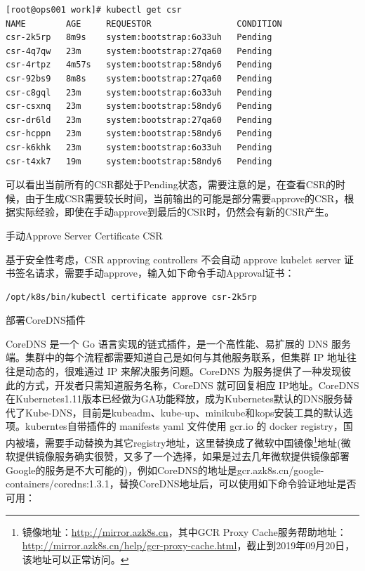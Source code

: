 \documentclass[8pt]{book}
\makeatletter
\numberwithin{dummy}{section}
\theoremstyle{ocrenumbox}
\theoremstyle{blacknumex}
\theoremstyle{blacknumbox}
\theoremstyle{ocrenum}
\renewcommand{\subsection}{\@startsection {subsection}{2}{\z@}
	{-3ex \@plus -0.1ex \@minus -.4ex}
	{0.5ex \@plus.2ex }
	{\normalfont\sffamily\bfseries}}
\renewcommand{\subsubsection}{\@startsection {subsubsection}{3}{\z@}
	{-2ex \@plus -0.1ex \@minus -.2ex}
	{.2ex \@plus.2ex }
	{\normalfont\small\sffamily\bfseries}}
\makeatother
\begin{document}
\begin{lstlisting}[language=Bash]
[root@ops001 work]# kubectl get csr
NAME        AGE     REQUESTOR                 CONDITION
csr-2k5rp   8m9s    system:bootstrap:6o33uh   Pending
csr-4q7qw   23m     system:bootstrap:27qa60   Pending
csr-4rtpz   4m57s   system:bootstrap:58ndy6   Pending
csr-92bs9   8m8s    system:bootstrap:27qa60   Pending
csr-c8gql   23m     system:bootstrap:6o33uh   Pending
csr-csxnq   23m     system:bootstrap:58ndy6   Pending
csr-dr6ld   23m     system:bootstrap:27qa60   Pending
csr-hcppn   23m     system:bootstrap:58ndy6   Pending
csr-k6khk   23m     system:bootstrap:6o33uh   Pending
csr-t4xk7   19m     system:bootstrap:58ndy6   Pending
\end{lstlisting}

可以看出当前所有的CSR都处于Pending状态，需要注意的是，在查看CSR的时候，由于生成CSR需要较长时间，当前输出的可能是部分需要approve的CSR，根据实际经验，即使在手动approve到最后的CSR时，仍然会有新的CSR产生。

\subsubsection{手动Approve Server Certificate CSR}

基于安全性考虑，CSR approving controllers 不会自动 approve kubelet server 证书签名请求，需要手动approve，输入如下命令手动Approval证书：

\begin{lstlisting}[language=Bash]
/opt/k8s/bin/kubectl certificate approve csr-2k5rp
\end{lstlisting}

\subsection{部署CoreDNS插件}

CoreDNS 是一个 Go 语言实现的链式插件，是一个高性能、易扩展的 DNS 服务端。集群中的每个流程都需要知道自己是如何与其他服务联系，但集群 IP 地址往往是动态的，很难通过 IP 来解决服务问题。CoreDNS 为服务提供了一种发现彼此的方式，开发者只需知道服务名称，CoreDNS 就可回复相应 IP地址。CoreDNS在Kubernetes1.11版本已经做为GA功能释放，成为Kubernetes默认的DNS服务替代了Kube-DNS，目前是kubeadm、kube-up、minikube和kops安装工具的默认选项。kuberntes自带插件的 manifests yaml 文件使用 gcr.io 的 docker registry，国内被墙，需要手动替换为其它registry地址，这里替换成了微软中国镜像\footnote{镜像地址：\url{http://mirror.azk8s.cn}，其中GCR Proxy Cache服务帮助地址：\url{http://mirror.azk8s.cn/help/gcr-proxy-cache.html}，截止到2019年09月20日，该地址可以正常访问。}地址(微软提供镜像服务确实很赞，又多了一个选择，如果是过去几年微软提供镜像部署Google的服务是不大可能的)，例如CoreDNS的地址是gcr.azk8s.cn/google-containers/coredns:1.3.1，替换CoreDNS地址后，可以使用如下命令验证地址是否可用：
\end{document}
